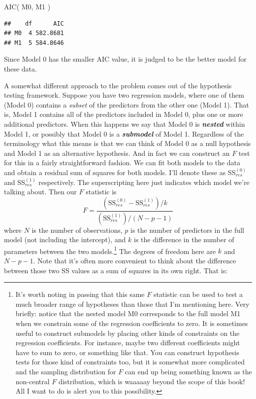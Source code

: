 \documentclass[
]{book}
\newenvironment{Shaded}{\begin{snugshade}}{\end{snugshade}}
\newcommand{\FunctionTok}[1]{\textcolor[rgb]{0.00,0.00,0.00}{#1}}
\newcommand{\NormalTok}[1]{#1}
\begin{document}
\begin{Shaded}
\begin{Highlighting}[]
\FunctionTok{AIC}\NormalTok{( M0, M1 )}
\end{Highlighting}
\end{Shaded}

\begin{verbatim}
##    df      AIC
## M0  4 582.8681
## M1  5 584.8646
\end{verbatim}

Since Model 0 has the smaller AIC value, it is judged to be the better model for these data.

A somewhat different approach to the problem comes out of the hypothesis testing framework. Suppose you have two regression models, where one of them (Model 0) contains a \emph{subset} of the predictors from the other one (Model 1). That is, Model 1 contains all of the predictors included in Model 0, plus one or more additional predictors. When this happens we say that Model 0 is \textbf{\emph{nested}} within Model 1, or possibly that Model 0 is a \textbf{\emph{submodel}} of Model 1. Regardless of the terminology what this means is that we can think of Model 0 as a null hypothesis and Model 1 as an alternative hypothesis. And in fact we can construct an \(F\) test for this in a fairly straightforward fashion. We can fit both models to the data and obtain a residual sum of squares for both models. I'll denote these as SS\(_{res}^{(0)}\) and SS\(_{res}^{(1)}\) respectively. The superscripting here just indicates which model we're talking about. Then our \(F\) statistic is
\[
F = \frac{(\mbox{SS}_{res}^{(0)} - \mbox{SS}_{res}^{(1)})/k}{(\mbox{SS}_{res}^{(1)})/(N-p-1)}
\]
where \(N\) is the number of observations, \(p\) is the number of predictors in the full model (not including the intercept), and \(k\) is the difference in the number of parameters between the two models.\footnote{It's worth noting in passing that this same \(F\) statistic can be used to test a much broader range of hypotheses than those that I'm mentioning here. Very briefly: notice that the nested model M0 corresponds to the full model M1 when we constrain some of the regression coefficients to zero. It is sometimes useful to construct submodels by placing other kinds of constraints on the regression coefficients. For instance, maybe two different coefficients might have to sum to zero, or something like that. You can construct hypothesis tests for those kind of constraints too, but it is somewhat more complicated and the sampling distribution for \(F\) can end up being something known as the non-central \(F\) distribution, which is waaaaay beyond the scope of this book! All I want to do is alert you to this possibility.} The degrees of freedom here are \(k\) and \(N-p-1\). Note that it's often more convenient to think about the difference between those two SS values as a sum of squares in its own right. That is:
\end{document}
